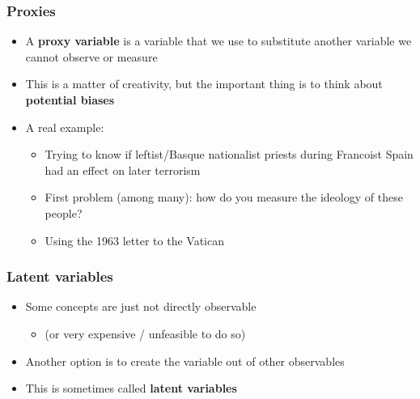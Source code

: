 \documentclass[aspectratio=43]{beamer}
\begin{document}
\begin{frame}
\frametitle{Proxies}
\centering

\begin{itemize}
  \item A \textbf{proxy variable} is a variable that we use to substitute another variable we cannot observe or measure
  \item This is a matter of creativity, but the important thing is to think about \textbf{potential biases}
  \item A real example:
  \begin{itemize}
    \item Trying to know if leftist/Basque nationalist priests during Francoist Spain had an effect on later terrorism
    \item First problem (among many): how do you measure the ideology of these people?
    \item Using the 1963 letter to the Vatican
  \end{itemize}
\end{itemize}

\end{frame}

\begin{frame}
\frametitle{Latent variables}
\centering

\begin{itemize}
  \item Some concepts are just not directly observable
  \begin{itemize}
    \item (or very expensive / unfeasible to do so)
  \end{itemize}
  \item Another option is to create the variable out of other observables
  \item This is sometimes called \textbf{latent variables}
\end{itemize}

\end{frame}
\end{document}

